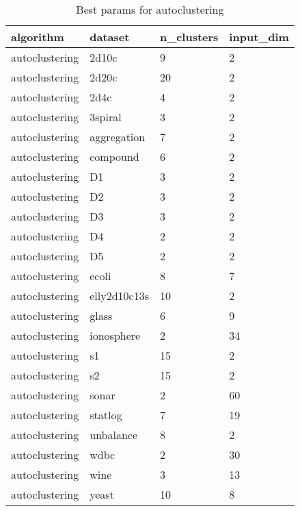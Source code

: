 \begin{table}[H]
\centering
\caption{Best params for autoclustering}
\label{S6_Table}
\begin{tabular}{|l|l|l|l|}
\hline
algorithm & dataset & n\_clusters & input\_dim \\
\hline
autoclustering & 2d10c & 9 & 2 \\
\hline
autoclustering & 2d20c & 20 & 2 \\
\hline
autoclustering & 2d4c & 4 & 2 \\
\hline
autoclustering & 3spiral & 3 & 2 \\
\hline
autoclustering & aggregation & 7 & 2 \\
\hline
autoclustering & compound & 6 & 2 \\
\hline
autoclustering & D1 & 3 & 2 \\
\hline
autoclustering & D2 & 3 & 2 \\
\hline
autoclustering & D3 & 3 & 2 \\
\hline
autoclustering & D4 & 2 & 2 \\
\hline
autoclustering & D5 & 2 & 2 \\
\hline
autoclustering & ecoli & 8 & 7 \\
\hline
autoclustering & elly2d10c13s & 10 & 2 \\
\hline
autoclustering & glass & 6 & 9 \\
\hline
autoclustering & ionosphere & 2 & 34 \\
\hline
autoclustering & s1 & 15 & 2 \\
\hline
autoclustering & s2 & 15 & 2 \\
\hline
autoclustering & sonar & 2 & 60 \\
\hline
autoclustering & statlog & 7 & 19 \\
\hline
autoclustering & unbalance & 8 & 2 \\
\hline
autoclustering & wdbc & 2 & 30 \\
\hline
autoclustering & wine & 3 & 13 \\
\hline
autoclustering & yeast & 10 & 8 \\
\hline
\end{tabular}
\end{table}

\clearpage

